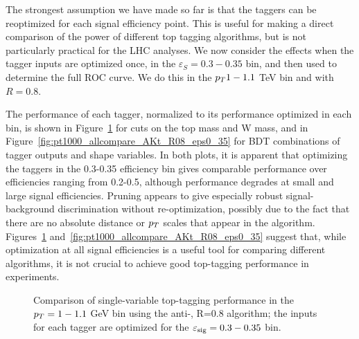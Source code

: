 The strongest assumption we have made so far is that the taggers can be reoptimized for each signal efficiency point. This is useful for making a direct comparison of the power of different top tagging algorithms, but is not particularly practical for the LHC analyses. We now consider the effects when the tagger inputs are optimized once, in the $\varepsilon_S=0.3-0.35$ bin, and then used to determine the full ROC curve. We do this in the  $p_T 1-1.1$ TeV bin and with $R=0.8$.

The performance of each tagger, normalized to its performance optimized in each bin, is shown in Figure~\ref{fig:single_variable_ROC_eps0_35} for cuts on the top mass and W mass, and in Figure~\ref{fig:pt1000_allcompare_AKt_R08_eps0_35} for BDT combinations of tagger outputs and shape variables. In both plots, it is apparent that optimizing the taggers in the 0.3-0.35 efficiency bin gives comparable performance over efficiencies ranging from 0.2-0.5, although performance degrades at small and large signal efficiencies. Pruning appears to give especially robust signal-background discrimination without re-optimization, possibly due to the fact that there are no absolute distance or $p_T$ scales that appear in the algorithm. Figures~\ref{fig:single_variable_ROC_eps0_35} and~\ref{fig:pt1000_allcompare_AKt_R08_eps0_35} suggest that, while optimization at all signal efficiencies is a useful tool for comparing different algorithms, it is not crucial to achieve good top-tagging performance in experiments.

\begin{figure}
\centering
{}
\caption{Comparison of single-variable top-tagging performance in the $p_T= 1-1.1$ GeV bin using the anti-\kT, R=0.8 algorithm; the inputs for each tagger are optimized for the $\varepsilon_{\rm sig}=0.3-0.35$ bin.}
\label{fig:single_variable_ROC_eps0_35}
\end{figure}

